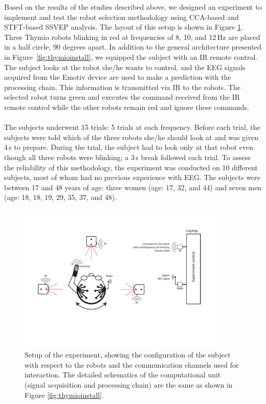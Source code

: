 \documentclass[smallextended]{svjour3}
\begin{document}
Based on the results of the studies described above, we designed an experiment to implement and test the robot selection methodology using CCA-based and STFT-based SSVEP analysis. 
The layout of this setup is shown in Figure \ref{fig:experiment-set-up}. 
Three Thymio robots blinking in red at frequencies of 8, 10, and 12\,Hz are placed in a half circle, 90 degrees apart.
In addition to the general architecture presented in Figure~\ref{fig:thymioinstall}, we equipped the subject with an IR remote control.
The subject looks at the robot she/he wants to control, and the EEG signals acquired from the Emotiv device are used to make a prediction with the processing chain.
This information is transmitted via IR to the robots.
The selected robot turns green and executes the command received from the IR remote control while the other robots remain red and ignore these commands.\\
\\
The subjects underwent 15 trials: 5 trials at each frequency. Before each trial, the subjects were told which of the three robots she/he should look at and was given 4\,s to prepare. During the trial, the subject had to look only at that robot even though all three robots were blinking; a 3\,s break followed each trial.
To assess the reliability of this methodology, the experiment was conducted on 10 different subjects, most of whom had no previous experience with EEG.
The subjects were between 17 and 48 years of age: three women (age: 17, 32, and 44) and seven men (age: 18, 18, 19, 29, 35, 37, and 48). 

\begin{figure}
\center
\includegraphics[width=0.9\textwidth]{figures/schema-global2.pdf}
    \caption{Setup of the experiment, showing the configuration of the subject with respect to the robots and the communication channels used for interaction. The detailed schematics of the computational unit (signal acquisition and processing chain) are the same as shown in Figure \ref{fig:thymioinstall}.} \label{fig:experiment-set-up}
\end{figure}
\end{document}
